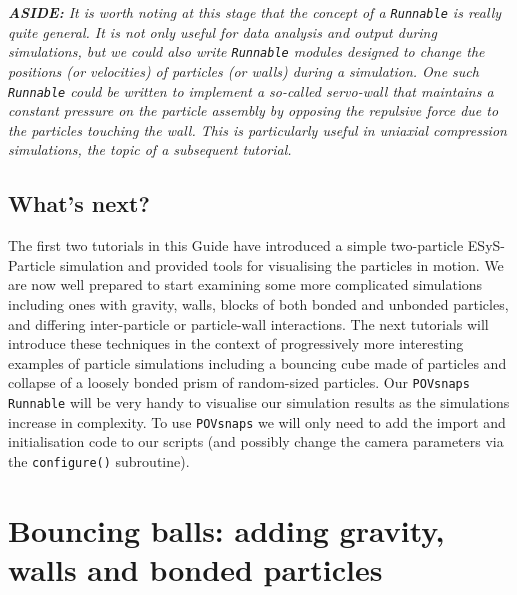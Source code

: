 \vskip 5mm
\begin{minipage}{5.75in}
\emph{\textbf{ASIDE:} It is worth noting at this stage that the concept of a \texttt{Runnable} is really quite general. It is not only useful for data analysis and output during simulations, but we could also write \texttt{Runnable} modules designed to change the positions (or velocities) of particles (or walls) during a simulation. One such \texttt{Runnable} could be written to implement a so-called \emph{servo-wall} that maintains a constant pressure on the particle assembly by opposing the repulsive force due to the particles touching the wall. This is particularly useful in uniaxial compression simulations, the topic of a subsequent tutorial.}
\end{minipage}
\vskip 5mm

\subsection*{What's next?}

The first two tutorials in this Guide have introduced a simple two-particle ESyS-Particle simulation and provided tools for visualising the particles in motion. We are now well prepared to start examining some more complicated simulations including ones with gravity, walls, blocks of both bonded and unbonded particles, and differing inter-particle or particle-wall interactions. The next tutorials will introduce these techniques in the context of progressively more interesting examples of particle simulations including a bouncing cube made of particles and collapse of a loosely bonded prism of random-sized particles. Our \texttt{POVsnaps Runnable} will be very handy to visualise our simulation results as the simulations increase in complexity. To use \texttt{POVsnaps} we will only need to add the import and initialisation code to our scripts (and possibly change the camera parameters via the \texttt{configure()} subroutine).


\newpage
\section{Bouncing balls: adding gravity, walls and bonded particles}

